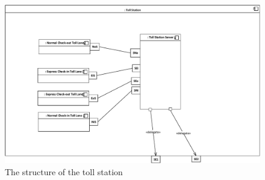 \begin{figure}[H]
\centerline{\includegraphics[width=\textwidth]{img/composite_structure_diagram/cscd_toll_station}}
\caption{The structure of the toll station}
\label{fig:csd_ts}
\end{figure}
